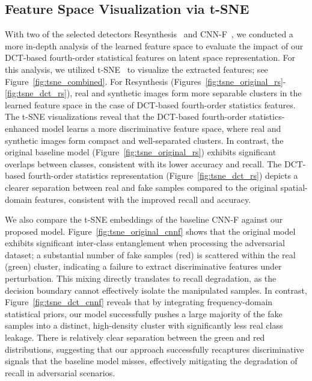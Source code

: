 \documentclass[letterpaper,twocolumn,10pt]{article}
\begin{document}
\subsection{Feature Space Visualization via t-SNE}
With two of the selected detectors Resynthesis~\cite{he2021Resynthesis} and CNN-F~\cite{Wang2024cnngenerated}, we conducted a more in-depth analysis of the learned feature space to evaluate the impact of our DCT-based fourth-order statistical features on latent space representation. For this analysis, we utilized t-SNE~\cite{JMLR:v9:vandermaaten08a} to visualize the extracted features; see Figure~\ref{fig:tsne_combined}.  
For Resynthesis (Figures~\ref{fig:tsne_original_rs}-\ref{fig:tsne_dct_rs}), real and synthetic images form more separable clusters in the learned feature space in the case of DCT-based fourth-order statistics features. The t-SNE visualizations reveal that the DCT-based fourth-order statistics-enhanced model learns a more discriminative feature space, where real and synthetic images form compact and well-separated clusters. In contrast, the original baseline model (Figure~\ref{fig:tsne_original_rs}) exhibits significant overlaps between classes, consistent with its lower accuracy and recall. The DCT-based fourth-order statistics representation (Figure~\ref{fig:tsne_dct_rs}) depicts a clearer separation between real and fake samples compared to the original spatial-domain features, consistent with the improved recall and accuracy. 

We also compare the t-SNE embeddings of the baseline CNN-F against our proposed model. Figure~\ref{fig:tsne_original_cnnf} shows that the original model exhibits significant inter-class entanglement when processing the adversarial dataset; a substantial number of fake samples (red) is scattered within the real (green) cluster, indicating a failure to extract discriminative features under perturbation. This mixing directly translates to recall degradation, as the decision boundary cannot effectively isolate the manipulated samples. In contrast, Figure~\ref{fig:tsne_dct_cnnf} reveals that by integrating frequency-domain statistical priors, our model successfully pushes a large majority of the fake samples into a distinct, high-density cluster with significantly less real class leakage. There is relatively clear separation between the green and red distributions, suggesting that our approach successfully recaptures discriminative signals that the baseline model misses, effectively mitigating the degradation of recall in adversarial scenarios.
\end{document}

